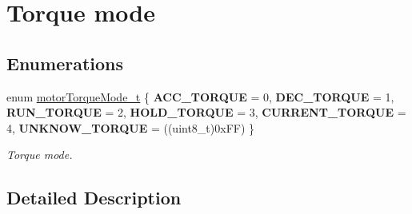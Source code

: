 \hypertarget{group___torque__mode}{}\section{Torque mode}
\label{group___torque__mode}
\subsection*{Enumerations}
\begin{DoxyCompactItemize}
\item 
\mbox{\label{group___torque__mode_ga41f68f90d74c690988fdd6d949c7a75d}} 
enum \mbox{\hyperlink{group___torque__mode_ga41f68f90d74c690988fdd6d949c7a75d}{motor\+Torque\+Mode\+\_\+t}} \{ \newline
{\bfseries A\+C\+C\+\_\+\+T\+O\+R\+Q\+UE} = 0, 
{\bfseries D\+E\+C\+\_\+\+T\+O\+R\+Q\+UE} = 1, 
{\bfseries R\+U\+N\+\_\+\+T\+O\+R\+Q\+UE} = 2, 
{\bfseries H\+O\+L\+D\+\_\+\+T\+O\+R\+Q\+UE} = 3, 
\newline
{\bfseries C\+U\+R\+R\+E\+N\+T\+\_\+\+T\+O\+R\+Q\+UE} = 4, 
{\bfseries U\+N\+K\+N\+O\+W\+\_\+\+T\+O\+R\+Q\+UE} = ((uint8\+\_\+t)0x\+FF)
 \}
\begin{DoxyCompactList}\small\item\em Torque mode. \end{DoxyCompactList}\end{DoxyCompactItemize}


\subsection{Detailed Description}
